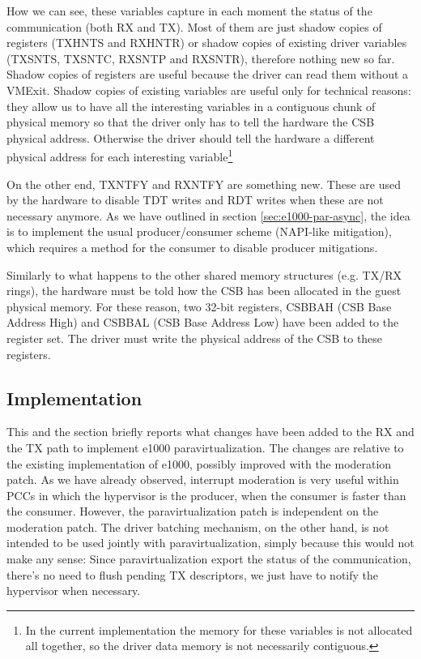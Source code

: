 \vspace{0.5cm}

How we can see, these variables capture in each moment the status of the communication (both RX and TX). Most of them are just shadow
copies of registers (TXHNTS and RXHNTR) or shadow copies of existing driver variables (TXSNTS, TXSNTC, RXSNTP and RXSNTR), therefore
nothing new so far. Shadow copies of registers are useful because the driver can read them without a VMExit. Shadow copies of existing
variables are useful only for technical reasons: they allow us to have all the interesting variables in a contiguous chunk of physical 
memory so that the driver only has to tell the hardware the CSB physical address. Otherwise the driver should tell the hardware a different
physical address for each interesting variable\footnote{In the current implementation the memory for these variables is not allocated all
together, so the driver data memory is not necessarily contiguous.}

\vspace{0.5cm}

On the other end, TXNTFY and RXNTFY are something new. These are used by the hardware to disable TDT writes and RDT writes when
these are not necessary anymore. As we have outlined in section \ref{sec:e1000-par-async}, the idea is to implement the usual
producer/consumer scheme (NAPI-like mitigation), which requires a method for the consumer to disable producer mitigations.

\vspace{0.5cm}

Similarly to what happens to the other shared memory structures (e.g. TX/RX rings), the hardware must be told how the CSB has been allocated
in the guest physical memory. For these reason, two 32-bit registers, CSBBAH (CSB Base Address High) and CSBBAL (CSB Base Address Low)
have been added to the register set. The driver must write the physical address of the CSB to these registers.


\subsection{Implementation}
This and the section briefly reports what changes have been added to the RX and the TX path to implement e1000 paravirtualization.
The changes are relative to the existing implementation of e1000, possibly improved with the moderation patch.
As we have already observed, interrupt moderation is very useful within PCCs in which the hypervisor is the producer, when the consumer
is faster than the consumer. However, the paravirtualization patch is independent on the moderation patch.
The driver batching mechanism, on the other hand, is not intended to be used jointly with paravirtualization, simply because this would not
make any sense: Since paravirtualization export the status of the communication, there's no need to flush pending TX descriptors, we just
have to notify the hypervisor when necessary.

